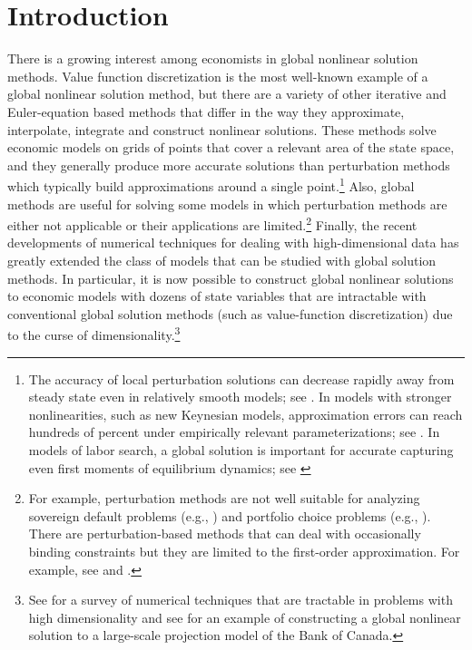 
\section{Introduction}

There is a growing interest among economists in global nonlinear solution
methods. Value function discretization is the most well-known example of a
global nonlinear solution method, but there are a variety of other iterative
and Euler-equation based methods that differ in the way they approximate,
interpolate, integrate and construct nonlinear solutions. These methods solve
economic models on grids of points that cover a relevant area of the state
space, and they generally produce more accurate solutions than perturbation
methods which typically build approximations around a single point.\footnote{
The accuracy of local perturbation solutions can decrease rapidly away from
steady state even in relatively smooth models; see \cite{KKK2011}. In models
with stronger nonlinearities, such as new Keynesian models, approximation
errors can reach hundreds of percent under empirically relevant
parameterizations; see \cite{JMM2017}. In models of labor search, a global
solution is important for accurate capturing even first moments of equilibrium
dynamics; see \cite{PZ2017}} Also, global methods are useful for solving some
models in which perturbation methods are either not applicable or their
applications are limited.\footnote{ For example, perturbation methods are not
well suitable for analyzing sovereign default problems (e.g.,
\cite{Arellano2008}) and portfolio choice problems (e.g., \cite{HK2013}). There
are perturbation-based methods that can deal with occasionally binding
constraints but they are limited to the first-order approximation. For example,
see \cite{LS2011} and \cite{GI2015}.} Finally, the recent developments of numerical
techniques for dealing with high-dimensional data has greatly extended the
class of models that can be studied with global solution methods. In
particular, it is now possible to construct global nonlinear solutions to
economic models with dozens of state variables that are intractable with
conventional global solution methods (such as value-function discretization)
due to the curse of dimensionality.\footnote{ See \cite{MM2014} for a survey of
numerical techniques that are tractable in problems with high dimensionality
and see \cite{LMM2017} for an example of constructing a global nonlinear
solution to a large-scale projection model of the Bank of Canada.}

